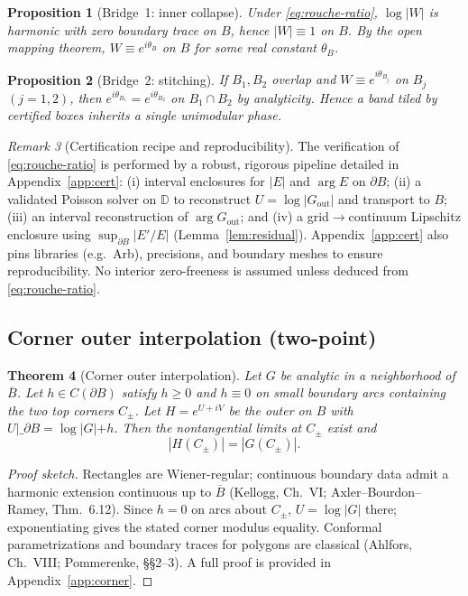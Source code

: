 \documentclass[11pt]{article}
\numberwithin{equation}{section}
\newtheorem{theorem}{Theorem}[section]
\newtheorem{proposition}[theorem]{Proposition}
\theoremstyle{remark}
\newtheorem{remark}[theorem]{Remark}
\newcommand{\D}{\mathbb{D}}
\newcommand{\Gout}{G_{\mathrm{out}}}
\begin{document}
\begin{proposition}[Bridge~1: inner collapse]\label{prop:bridge1}
Under \eqref{eq:rouche-ratio}, $\log|W|$ is harmonic with zero boundary trace on $B$, hence $|W|\equiv 1$ on $B$. By the open mapping theorem, $W\equiv e^{i\theta_B}$ on $B$ for some real constant $\theta_B$.
\end{proposition}

\begin{proposition}[Bridge~2: stitching]\label{prop:bridge2}
If $B_1,B_2$ overlap and $W\equiv e^{i\theta_{B_j}}$ on $B_j$ $(j=1,2)$, then $e^{i\theta_{B_1}}=e^{i\theta_{B_2}}$ on $B_1\cap B_2$ by analyticity. Hence a band tiled by certified boxes inherits a single unimodular phase.
\end{proposition}

\begin{remark}[Certification recipe and reproducibility]
The verification of \eqref{eq:rouche-ratio} is performed by a robust, rigorous pipeline detailed in Appendix~\ref{app:cert}: (i) interval enclosures for $|E|$ and $\arg E$ on $\partial B$; (ii) a validated Poisson solver on $\D$ to reconstruct $U=\log|\Gout|$ and transport to $B$; (iii) an interval reconstruction of $\arg\Gout$; and (iv) a grid$\to$continuum Lipschitz enclosure using $\sup_{\partial B}|E'/E|$ (Lemma~\ref{lem:residual}). Appendix~\ref{app:cert} also pins libraries (e.g.\ Arb), precisions, and boundary meshes to ensure reproducibility. No interior zero-freeness is assumed unless deduced from \eqref{eq:rouche-ratio}.
\end{remark}

\subsection{Corner outer interpolation (two-point)}\label{subsec:corner-interp}

\begin{theorem}[Corner outer interpolation]\label{thm:corner-outer}
Let $G$ be analytic in a neighborhood of $\overline B$. Let $h\in C(\partial B)$ satisfy $h\ge 0$ and $h\equiv 0$ on small boundary arcs containing the two top corners $C_\pm$. Let $H=e^{U+iV}$ be the outer on $B$ with $U|\_{\partial B}=\log|G|+h$. Then the nontangential limits at $C_\pm$ exist and
\[
|H(C_\pm)|=|G(C_\pm)|.
\]
\end{theorem}

\begin{proof}[Proof sketch]
Rectangles are Wiener-regular; continuous boundary data admit a harmonic extension continuous up to $\overline B$ (Kellogg, Ch.~VI; Axler--Bourdon--Ramey, Thm.~6.12). Since $h=0$ on arcs about $C_\pm$, $U=\log|G|$ there; exponentiating gives the stated corner modulus equality. Conformal parametrizations and boundary traces for polygons are classical (Ahlfors, Ch.~VIII; Pommerenke, §§2–3). A full proof is provided in Appendix~\ref{app:corner}.
\end{proof}
\end{document}
